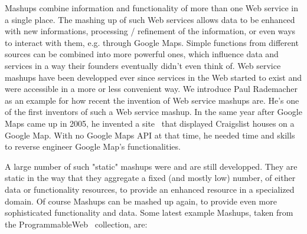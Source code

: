 








Mashups combine information and functionality of more than one Web service in a single place.
The mashing up of such Web services allows data to be enhanced with new informations, processing / refinement of the information, or even ways to interact with them, e.g. through Google Maps.
Simple functions from different sources can be combined into more powerful ones, which influence data and services in a way their founders eventually didn't even think of.
Web service mashups have been developped ever since services in the Web started to exist and were accessible in a more or less convenient way.
We introduce Paul Rademacher as an example for how recent the invention of Web service mashups are.
He's one of the first inventors of such a Web service mashup.
In the same year after Google Maps came up in 2005, he invented a site~\cite{wwwRademacherOne,wwwRademacherTwo} that displayed Craigslist houses on a Google Map.
With no Google Maps API at that time, he needed time and skills to reverse engineer Google Map's functionalities.


A large number of such "static" mashups were and are still developped.
They are static in the way that they aggregate a fixed (and mostly low) number, of either data or functionality resources, to provide an enhanced resource in a specialized domain.
Of course Mashups can be mashed up again, to provide even more sophisticated functionality and data.
Some latest example Mashups, taken from the ProgrammableWeb~\cite{wwwProgrammableWeb} collection, are:

